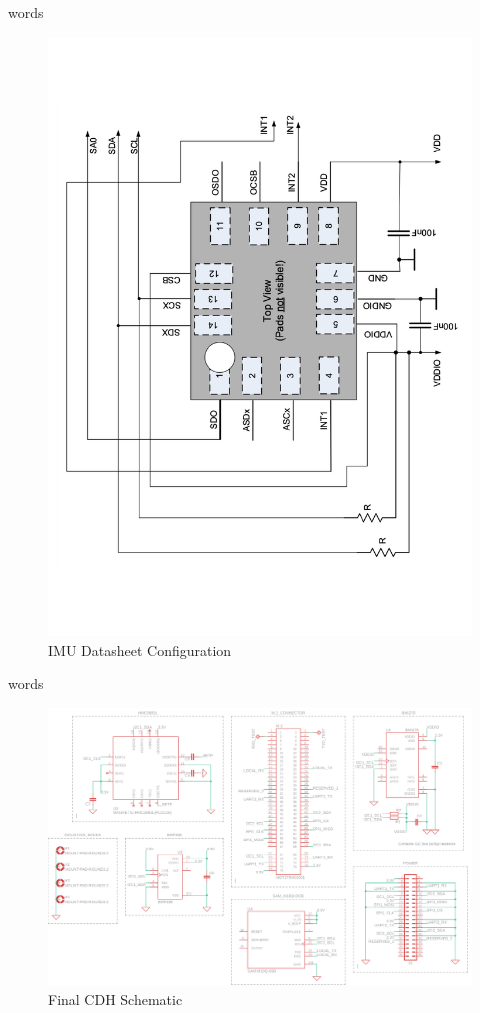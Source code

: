 \documentclass{report}
\begin{document}
            words
            \begin{figure}[H]
                \centering
                \includegraphics[width=0.5\linewidth, angle=270]{figures/IMU_DS.pdf}
                \caption{IMU Datasheet Configuration}
                \label{fig:imu_ds}
            \end{figure}
            words
            \begin{figure}[H]
                \centering
                \includegraphics[width=0.8\linewidth]{figures/CDH_SCHM.png}
                \caption{Final CDH Schematic}
                \label{fig:cdh_schm}
            \end{figure}
\end{document}
